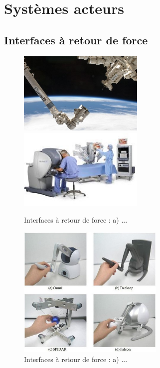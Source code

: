 \section{Systèmes acteurs}

\subsection{Interfaces à retour de force}
\begin{figure}[!h]
	\centering
	\includegraphics[width=6cm]{1_Bible/Photos/Apparatus/bras_ca.jpg}\hspace{2cm}
	\includegraphics[width=6cm]{1_Bible/Photos/Apparatus/da_vinci.jpg}
	\caption{Interfaces à retour de force : a) ... }\label{int_retourf_1}
\end{figure}
\begin{figure}[!h]
	\centering
	\includegraphics[width=7cm]{1_Bible/Photos/Apparatus/falcon.jpg}
	\caption{Interfaces à retour de force : a) ... }\label{int_retourf_2}
\end{figure}	
